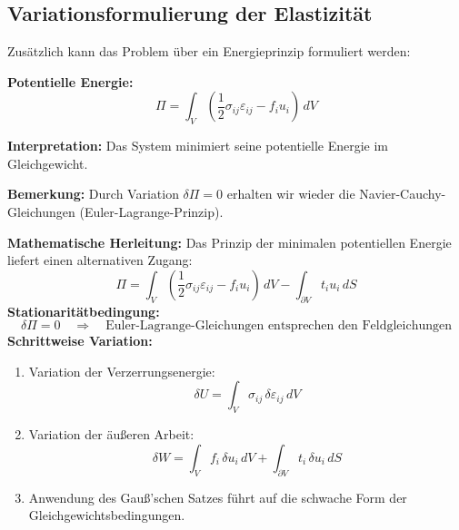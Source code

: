 \subsection{Variationsformulierung der Elastizität}
Zusätzlich kann das Problem über ein Energieprinzip formuliert werden:

\textbf{Potentielle Energie:}
	\begin{equation}
		\Pi = 
		\int_V \left( \frac{1}{2} \sigma_{ij} \varepsilon_{ij} - f_i u_i \right) \, dV
	\end{equation}
	
\textbf{Interpretation:} Das System minimiert seine potentielle Energie im Gleichgewicht.

\textbf{Bemerkung:} Durch Variation $\delta \Pi = 0$ erhalten wir wieder die Navier-Cauchy-Gleichungen (Euler-Lagrange-Prinzip).

\bigskip

\textbf{Mathematische Herleitung:}
Das Prinzip der minimalen potentiellen Energie liefert einen alternativen Zugang:
	\begin{equation}
		\Pi = 
		\int_V \left( \frac{1}{2} \sigma_{ij} \varepsilon_{ij} - f_i u_i \right) \, dV - \int_{\partial V} 	t_i u_i \, dS
	\end{equation}
\textbf{Stationaritätbedingung:}
	\begin{equation}
		\delta \Pi = 
		0 \quad \Rightarrow \quad \text{Euler-Lagrange-Gleichungen entsprechen den Feldgleichungen}
	\end{equation}
\textbf{Schrittweise Variation:}
\begin{enumerate}
	\item Variation der Verzerrungsenergie:
	\begin{equation}
		\delta U = 
		\int_V \sigma_{ij} \, \delta \varepsilon_{ij} \, dV
	\end{equation}
	
	\item Variation der äußeren Arbeit:
	\begin{equation}
		\delta W = 
		\int_V f_i \, \delta u_i \, dV + \int_{\partial V} t_i \, \delta u_i \, dS
	\end{equation}
	
	\item Anwendung des Gauß'schen Satzes führt auf die schwache Form der Gleichgewichtsbedingungen.
\end{enumerate}

